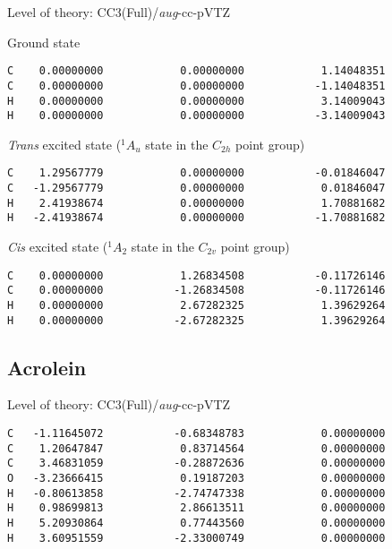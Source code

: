 \documentclass[journal=jctcce,manuscript=article,layout=traditional]{achemso}
\newcommand{\AVTZ}{\emph{aug}-cc-pVTZ}
\begin{document}
\begin{singlespace}
Level of theory: CC3(Full)/{\AVTZ}
\end{singlespace}

\begin{singlespace}
\noindent Ground state
\begin{verbatim}
C    0.00000000            0.00000000            1.14048351
C    0.00000000            0.00000000           -1.14048351
H    0.00000000            0.00000000            3.14009043
H    0.00000000            0.00000000           -3.14009043
\end{verbatim}
\end{singlespace}

\begin{singlespace}
\noindent \emph{Trans} excited state ($^1A_u$ state in the $C_{2h}$ point group)
\begin{verbatim}
C    1.29567779            0.00000000           -0.01846047
C   -1.29567779            0.00000000            0.01846047
H    2.41938674            0.00000000            1.70881682 
H   -2.41938674            0.00000000           -1.70881682
\end{verbatim}
\end{singlespace}

\begin{singlespace}
\noindent \emph{Cis} excited state ($^1A_2$ state in the $C_{2v}$ point group)
\begin{verbatim}
C    0.00000000            1.26834508           -0.11726146
C    0.00000000           -1.26834508           -0.11726146
H    0.00000000            2.67282325            1.39629264
H    0.00000000           -2.67282325            1.39629264
\end{verbatim}
\end{singlespace}

\subsection*{Acrolein}

\begin{singlespace}
Level of theory: CC3(Full)/{\AVTZ} 
\begin{verbatim}
C   -1.11645072           -0.68348783            0.00000000  
C    1.20647847            0.83714564            0.00000000 
C    3.46831059           -0.28872636            0.00000000 
O   -3.23666415            0.19187203            0.00000000 
H   -0.80613858           -2.74747338            0.00000000
H    0.98699813            2.86613511            0.00000000
H    5.20930864            0.77443560            0.00000000
H    3.60951559           -2.33000749            0.00000000
\end{verbatim}
\end{singlespace}
\end{document}
